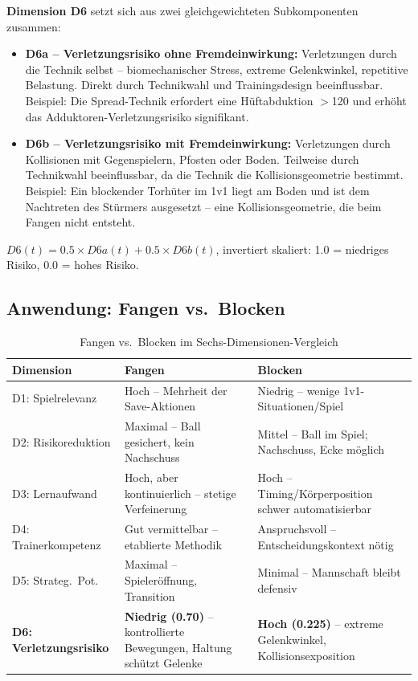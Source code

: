 \documentclass[12pt,a4paper]{article}
\begin{document}
\textbf{Dimension D6} setzt sich aus zwei gleichgewichteten Subkomponenten zusammen:

\begin{itemize}[nosep]
  \item \textbf{D6a -- Verletzungsrisiko ohne Fremdeinwirkung:} Verletzungen durch die Technik selbst -- biomechanischer Stress, extreme Gelenkwinkel, repetitive Belastung. Direkt durch Technikwahl und Trainingsdesign beeinflussbar. Beispiel: Die Spread-Technik erfordert eine H\"uftabduktion $>$120\textdegree{} und erh\"oht das Adduktoren-Verletzungsrisiko signifikant.
  \item \textbf{D6b -- Verletzungsrisiko mit Fremdeinwirkung:} Verletzungen durch Kollisionen mit Gegenspielern, Pfosten oder Boden. Teilweise durch Technikwahl beeinflussbar, da die Technik die Kollisionsgeometrie bestimmt. Beispiel: Ein blockender Torh\"uter im 1v1 liegt am Boden und ist dem Nachtreten des St\"urmers ausgesetzt -- eine Kollisionsgeometrie, die beim Fangen nicht entsteht.
\end{itemize}

$D6(t) = 0.5 \times D6a(t) + 0.5 \times D6b(t)$, invertiert skaliert: 1.0 = niedriges Risiko, 0.0 = hohes Risiko.


\subsection{Anwendung: Fangen vs.\ Blocken}
\label{sec:fangen-vs-blocken}

\begin{table}[H]
\centering
\caption{Fangen vs.\ Blocken im Sechs-Dimensionen-Vergleich}
\label{tab:vergleich}
\begin{tabularx}{\textwidth}{@{}l X X@{}}
\toprule
\textbf{Dimension} & \textbf{Fangen} & \textbf{Blocken} \\
\midrule
D1: Spielrelevanz & Hoch -- Mehrheit der Save-Aktionen & Niedrig -- wenige 1v1-Situationen/Spiel \\[6pt]
D2: Risikoreduktion & Maximal -- Ball gesichert, kein Nachschuss & Mittel -- Ball im Spiel; Nachschuss, Ecke m\"oglich \\[6pt]
D3: Lernaufwand & Hoch, aber kontinuierlich -- stetige Verfeinerung & Hoch -- Timing/K\"orperposition schwer automatisierbar \\[6pt]
D4: Trainerkompetenz & Gut vermittelbar -- etablierte Methodik & Anspruchsvoll -- Entscheidungskontext n\"otig \\[6pt]
D5: Strateg.\ Pot. & Maximal -- Spieler\"offnung, Transition & Minimal -- Mannschaft bleibt defensiv \\[6pt]
\textbf{D6: Verletzungsrisiko} & \textbf{Niedrig (0.70)} -- kontrollierte Bewegungen, Haltung sch\"utzt Gelenke & \textbf{Hoch (0.225)} -- extreme Gelenkwinkel, Kollisionsexposition \\
\bottomrule
\end{tabularx}
\end{table}
\end{document}
